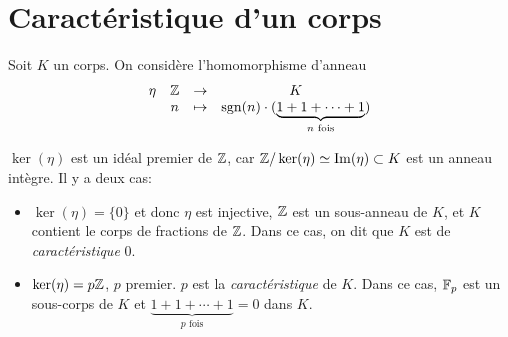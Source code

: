 
\section{Caractéristique d'un corps}
\label{sec:caract-dun-corps}

Soit $K$ un corps. On considère l'homomorphisme d'anneau 
\[
  \begin{array}{cccc}
    \eta & \mathbb{Z} & \to & K \\
    & n & \mapsto & \mathrm{sgn}(n) \cdot (\underbrace{1 + 1 + \cdots + 1}_{n \text{ fois}})
  \end{array}
\]

$\ker(\eta)$ est un idéal premier de $\mathbb{Z}$, car $\mathbb{Z}/\ker(\eta) \simeq \mathrm{Im}(\eta) \subset K$ est un
anneau intègre. Il y a deux cas:
\begin{itemize}
\item $\ker(\eta) = \{0\}$ et donc $\eta$ est injective, $\mathbb{Z}$ est un sous-anneau de $K$, et $K$ contient le
  corps de fractions de $\mathbb{Z}$. Dans ce cas, on dit que $K$ est de \emph{caractéristique} $0$.

\item $\ker(\eta) = p\mathbb{Z}$, $p$ premier. $p$ est la \emph{caractéristique} de $K$. Dans ce cas, $\mathbb{F}_p$ est un
  sous-corps de $K$ et $\underbrace{1 + 1 + \cdots + 1}_{p \text{ fois}} = 0$ dans $K$.
\end{itemize}


















